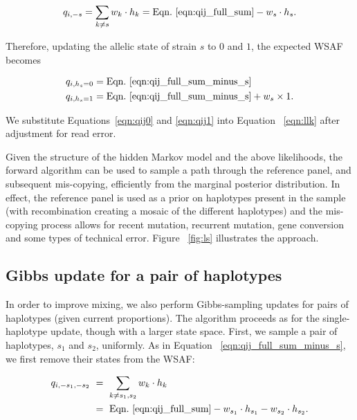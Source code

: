\documentclass{nature}
\begin{document}
\begin{equation}
q_{i,-s} = \sum_{k\neq s} w_k \cdot h_k = \textrm{Eqn.~\eqref{eqn:qij_full_sum}} -  w_s \cdot h_s. \label{eqn:qij_full_sum_minus_s}
\end{equation}

\noindent Therefore, updating the allelic state of strain $s$ to $0$ and $1$, the expected WSAF becomes

\begin{align}
q_{i,h_s=0} & = \textrm{Eqn.~\eqref{eqn:qij_full_sum_minus_s}} \label{eqn:qij0}\\
q_{i,h_s=1} & = \textrm{Eqn.~\eqref{eqn:qij_full_sum_minus_s}} + w_s \times 1. \label{eqn:qij1}
\end{align}

\noindent We substitute Equations~\eqref{eqn:qij0} and \eqref{eqn:qij1} into Equation ~\eqref{eqn:llk} after adjustment for read error.

Given the structure of the hidden Markov model and the above likelihoods, the forward algorithm can be used to sample a path through the reference panel, and subsequent mis-copying, efficiently from the marginal posterior distribution.  In effect, the reference panel is used as a prior on haplotypes present in the sample (with recombination creating a mosaic of the different haplotypes) and the mis-copying process allows for recent mutation, recurrent mutation, gene conversion and some types of technical error.  Figure ~\ref{fig:ls} illustrates the approach.






\subsection*{Gibbs update for a pair of haplotypes}\label{sec:deconvolute}

In order to improve mixing, we also perform Gibbs-sampling updates for pairs of haplotypes (given current proportions). The algorithm proceeds as for the single-haplotype update, though with a larger state space.  First, we sample a pair of haplotypes, $s_1$ and $s_2$, uniformly. As in Equation ~\eqref{eqn:qij_full_sum_minus_s}, we first remove their states from the WSAF:

\begin{equation}
\begin{split}
q_{i,-s_1, -s_2} & ~ = ~ \sum_{k\neq s_1,s_2} w_k \cdot h_k \\
                 & ~ = ~ \textrm{Eqn.~\eqref{eqn:qij_full_sum}} - w_{s_1} \cdot h_{s_1} - w_{s_2} \cdot h_{s_2}.
\label{eqn:qij_full_sum_minus_s1_s2}
\end{split}
\end{equation}
\end{document}
